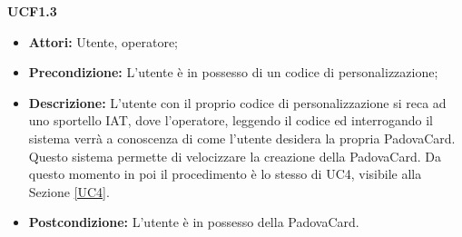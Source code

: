\textbf{UCF1.3}
\begin{itemize}
\item \textbf{Attori:} Utente, operatore;
\item \textbf{Precondizione:} L'utente è in possesso di un codice di personalizzazione;
\item \textbf{Descrizione:} L'utente con il proprio codice di personalizzazione si reca ad uno sportello IAT, dove l'operatore, leggendo il codice ed interrogando il sistema verrà a conoscenza di come l'utente desidera la propria PadovaCard. Questo sistema permette di velocizzare la creazione della PadovaCard. Da questo momento in poi il procedimento è lo stesso di UC4, visibile alla Sezione \ref{UC4}.

\item \textbf{Postcondizione:} L'utente è in possesso della PadovaCard.
\end{itemize}


